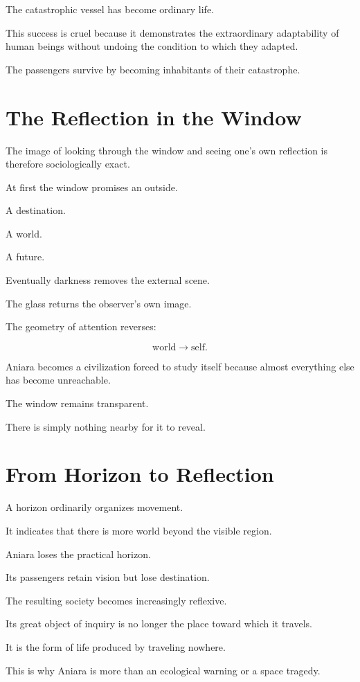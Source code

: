 \documentclass[11pt,oneside]{book}
\theoremstyle{definition}
\theoremstyle{remark}
\begin{document}
The catastrophic vessel has become ordinary life.

This success is cruel because it demonstrates the extraordinary adaptability of human beings without undoing the condition to which they adapted.

The passengers survive by becoming inhabitants of their catastrophe.

\section{The Reflection in the Window}

The image of looking through the window and seeing one's own reflection is therefore sociologically exact.

At first the window promises an outside.

A destination.

A world.

A future.

Eventually darkness removes the external scene.

The glass returns the observer's own image.

The geometry of attention reverses:

\[
\text{world}
\rightarrow
\text{self}.
\]

Aniara becomes a civilization forced to study itself because almost everything else has become unreachable.

The window remains transparent.

There is simply nothing nearby for it to reveal.

\section{From Horizon to Reflection}

A horizon ordinarily organizes movement.

It indicates that there is more world beyond the visible region.

Aniara loses the practical horizon.

Its passengers retain vision but lose destination.

The resulting society becomes increasingly reflexive.

Its great object of inquiry is no longer the place toward which it travels.

It is the form of life produced by traveling nowhere.

This is why Aniara is more than an ecological warning or a space tragedy.
\end{document}
